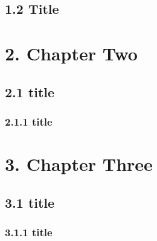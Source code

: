 \documentclass[a4paper, 11pt, UTF8, openright]{book}
\begin{document}
\section{1.2 Title}
\lipsum[1-5]

\chapter{2. Chapter Two}
\lipsum[1-5]

\section{2.1 title}
\lipsum[1-5]

\subsection{2.1.1 title}
\lipsum[1-5]


\chapter{3. Chapter Three}
\lipsum[1-5]

\section{3.1 title}
\lipsum[1-5]

\subsection{3.1.1 title}
\lipsum[1-5]





	
\end{document}
